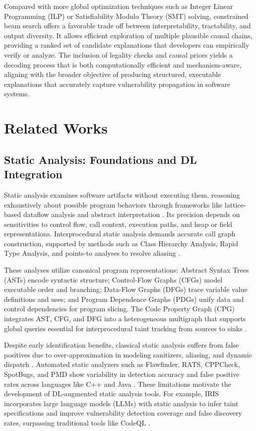 \documentclass{buthesis}
\begin{document}
Compared with more global optimization techniques such as Integer Linear Programming (ILP) or Satisfiability Modulo Theory (SMT) solving, constrained beam search offers a favorable trade off between interpretability, tractability, and output diversity. It allows efficient exploration of multiple plausible causal chains, providing a ranked set of candidate explanations that developers can empirically verify or analyze. The inclusion of legality checks and causal priors yields a decoding process that is both computationally efficient and mechanism-aware, aligning with the broader objective of producing structured, executable explanations that accurately capture vulnerability propagation in software systems.


\section{Related Works}

\subsection{Static Analysis: Foundations and DL Integration}

Static analysis examines software artifacts without executing them, reasoning exhaustively about possible program behaviors through frameworks like lattice-based dataflow analysis and abstract interpretation \cite{yamaguchi2014cpg, Chakraborty2020}. Its precision depends on sensitivities to control flow, call context, execution paths, and heap or field representations. Interprocedural static analysis demands accurate call graph construction, supported by methods such as Class Hierarchy Analysis, Rapid Type Analysis, and points-to analyses to resolve aliasing \cite{Xia2023, Liu2020}.

These analyses utilize canonical program representations: Abstract Syntax Trees (ASTs) encode syntactic structure; Control-Flow Graphs (CFGs) model executable order and branching; Data-Flow Graphs (DFGs) trace variable value definitions and uses; and Program Dependence Graphs (PDGs) unify data and control dependencies for program slicing. The Code Property Graph (CPG) integrates AST, CFG, and DFG into a heterogeneous multigraph that supports global queries essential for interprocedural taint tracking from sources to sinks \cite{yamaguchi2014cpg}.

Despite early identification benefits, classical static analysis suffers from false positives due to over-approximation in modeling sanitizers, aliasing, and dynamic dispatch \cite{Ruiz2023, Jatit2019}. Automated static analyzers such as Flawfinder, RATS, CPPCheck, SpotBugs, and PMD show variability in detection accuracy and false positive rates across languages like C++ and Java \cite{moonlight2025}. These limitations motivate the development of DL-augmented static analysis tools. For example, IRIS incorporates large language models (LLMs) with static analysis to infer taint specifications and improve vulnerability detection coverage and false discovery rates, surpassing traditional tools like CodeQL \cite{Li2024IRIS}.
\end{document}
